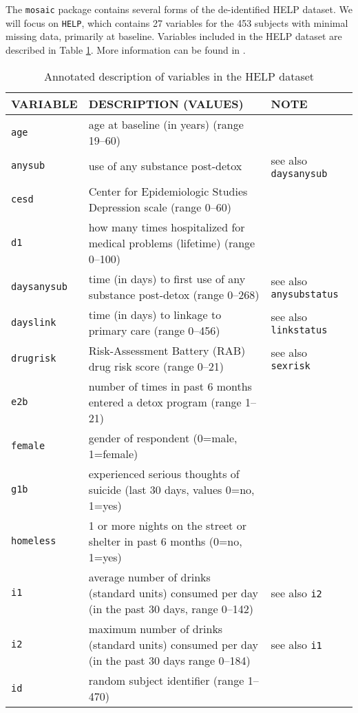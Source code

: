 The \verb!mosaic! package contains several forms of the de-identified HELP dataset.
We will focus on \verb!HELP!, which contains
27 variables for the 453 subjects
with minimal missing data, primarily at baseline.
Variables included in the HELP dataset are described in Table \ref{tab:helpvars}.  More information can be found in \cite{Horton:2011:R}.
\begin{longtable}{|p{2.1cm}|p{6.8cm}|p{4.5cm}|}
\caption{Annotated description of variables in the HELP dataset}
\label{tab:helpvars} \\
\hline
VARIABLE & DESCRIPTION (VALUES) & NOTE \\ \hline
{\tt age} & age at baseline (in years) (range 19--60) & \\ \hline
{\tt anysub} & use of any substance post-detox & see also {\tt daysanysub}
\\ \hline
{\tt cesd} & Center for Epidemiologic Studies Depression scale (range 0--60)  & \\ \hline
{\tt d1} & how many times hospitalized for medical problems (lifetime)  (range 0--100)  & \\ \hline
{\tt daysanysub} & time (in days) to first use of any substance post-detox (range 0--268)  & see also {\tt anysubstatus} \\ \hline
{\tt dayslink} & time (in days) to linkage to primary care (range 0--456)  & see also {\tt linkstatus}
\\ \hline
{\tt drugrisk} & Risk-Assessment Battery (RAB) drug risk score  (range 0--21)  & see also {\tt sexrisk}
\\ \hline
{\tt e2b} & number of times in past 6 months entered a detox program  (range 1--21)  & \\ \hline
{\tt female} & gender of respondent  (0=male, 1=female)  &
\\ \hline
{\tt g1b} & experienced serious thoughts of suicide (last 30 days, values 0=no, 1=yes)  &
\\ \hline
{\tt homeless} & 1 or more nights on the street or shelter in past 6 months (0=no, 1=yes) & 
\\ \hline
{\tt i1} & average number of drinks (standard units) consumed per day (in the past 30 days, range 0--142) & see also {\tt i2}
\\ \hline
{\tt i2} & maximum number of drinks (standard units) consumed per day (in the past 30 days range 0--184) & see also {\tt i1}
\\ \hline
{\tt id} & random subject identifier (range 1--470) &
\\ \hline

\end{longtable}

